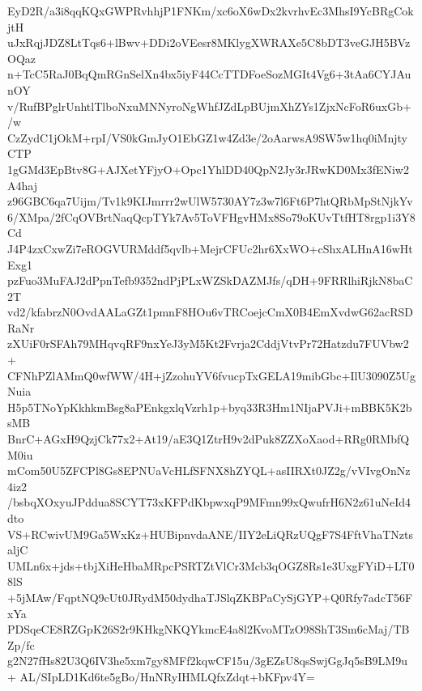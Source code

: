 EyD2R/a3i8qqKQxGWPRvhhjP1FNKm/xc6oX6wDx2kvrhvEc3MhsI9YcBRgCokjtH
uJxRqjJDZ8LtTqs6+lBwv+DDi2oVEesr8MKlygXWRAXe5C8bDT3veGJH5BVzOQaz
n+TcC5RaJ0BqQmRGnSelXn4bx5iyF44CcTTDFoeSozMGIt4Vg6+3tAa6CYJAunOY
v/RufBPglrUnhtlTlboNxuMNNyroNgWhfJZdLpBUjmXhZYs1ZjxNcFoR6uxGb+/w
CzZydC1jOkM+rpI/VS0kGmJyO1EbGZ1w4Zd3e/2oAarwsA9SW5w1hq0iMnjtyCTP
1gGMd3EpBtv8G+AJXetYFjyO+Opc1YhlDD40QpN2Jy3rJRwKD0Mx3fENiw2A4haj
z96GBC6qa7Uijm/Tv1k9KIJmrrr2wUlW5730AY7z3w7l6Ft6P7htQRbMpStNjkYv
6/XMpa/2fCqOVBrtNaqQcpTYk7Av5ToVFHgvHMx8So79oKUvTtfHT8rgp1i3Y8Cd
J4P4zxCxwZi7eROGVURMddf5qvlb+MejrCFUc2hr6XxWO+cShxALHnA16wHtExg1
pzFuo3MuFAJ2dPpnTefb9352ndPjPLxWZSkDAZMJfs/qDH+9FRRlhiRjkN8baC2T
vd2/kfabrzN0OvdAALaGZt1pmnF8HOu6vTRCoejcCmX0B4EmXvdwG62acRSDRaNr
zXUiF0rSFAh79MHqvqRF9nxYeJ3yM5Kt2Fvrja2CddjVtvPr72Hatzdu7FUVbw2+
CFNhPZlAMmQ0wfWW/4H+jZzohuYV6fvucpTxGELA19mibGbc+IlU3090Z5UgNuia
H5p5TNoYpKkhkmBsg8aPEnkgxlqVzrh1p+byq33R3Hm1NIjaPVJi+mBBK5K2bsMB
BnrC+AGxH9QzjCk77x2+At19/aE3Q1ZtrH9v2dPuk8ZZXoXaod+RRg0RMbfQM0iu
mCom50U5ZFCPl8Gs8EPNUaVcHLfSFNX8hZYQL+asIIRXt0JZ2g/vVIvgOnNz4iz2
/bsbqXOxyuJPddua8SCYT73xKFPdKbpwxqP9MFmn99xQwufrH6N2z61uNeId4dto
VS+RCwivUM9Ga5WxKz+HUBipnvdaANE/IIY2eLiQRzUQgF7S4FftVhaTNztsaljC
UMLn6x+jds+tbjXiHeHbaMRpcPSRTZtVlCr3Mcb3qOGZ8Rs1e3UxgFYiD+LT08lS
+5jMAw/FqptNQ9cUt0JRydM50dydhaTJSlqZKBPaCySjGYP+Q0Rfy7adcT56FxYa
PDSqeCE8RZGpK26S2r9KHkgNKQYkmcE4a8l2KvoMTzO98ShT3Sm6cMaj/TBZp/fc
g2N27fHs82U3Q6IV3he5xm7gy8MFf2kqwCF15u/3gEZsU8qsSwjGgJq5sB9LM9u+
AL/SIpLD1Kd6te5gBo/HnNRyIHMLQfxZdqt+bKFpv4Y=
